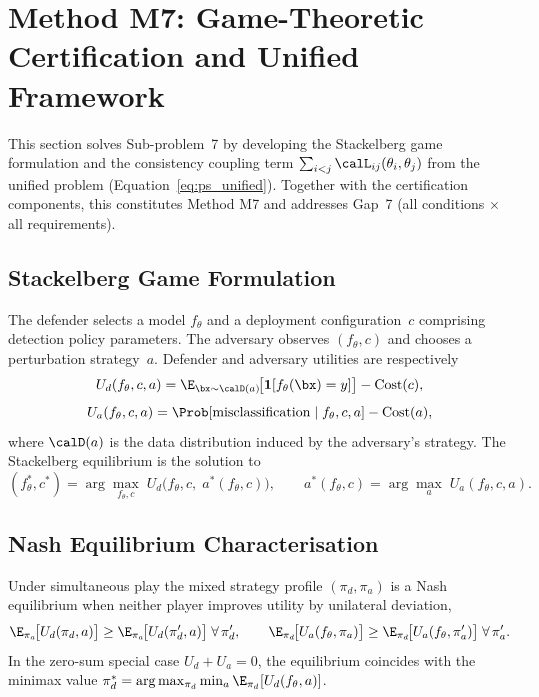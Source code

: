 \section{Method M7: Game-Theoretic Certification and Unified Framework}
\label{sec:game}

This section solves Sub-problem~7 by developing the Stackelberg game formulation and the consistency coupling term $\sum_{i<j}\calL_{ij}(\theta_i,\theta_j)$ from the unified problem (Equation~\eqref{eq:ps_unified}). Together with the certification components, this constitutes Method M7 and addresses Gap~7 (all conditions $\times$ all requirements).

\subsection{Stackelberg Game Formulation}

The defender selects a model $f_\theta$ and a deployment configuration~$c$ comprising detection policy parameters. The adversary observes $(f_\theta,c)$ and chooses a perturbation strategy~$a$. Defender and adversary utilities are respectively
\begin{equation}
U_d(f_\theta,c,a)
= \E_{\bx\sim\calD(a)}\!\bigl[\mathbf{1}[f_\theta(\bx)=y]\bigr] - \mathrm{Cost}(c),
\label{eq:game_ud}
\end{equation}
\begin{equation}
U_a(f_\theta,c,a)
= \Prob[\text{misclassification}\mid f_\theta,c,a] - \mathrm{Cost}(a),
\label{eq:game_ua}
\end{equation}
where $\calD(a)$ is the data distribution induced by the adversary's strategy. The Stackelberg equilibrium is the solution to
\begin{equation}
(f_\theta^*,c^*)
= \arg\max_{f_\theta,c}\;U_d\!\bigl(f_\theta,c,\;a^*(f_\theta,c)\bigr),
\qquad
a^*(f_\theta,c)=\arg\max_a\;U_a(f_\theta,c,a).
\label{eq:game_stackel}
\end{equation}

\subsection{Nash Equilibrium Characterisation}

Under simultaneous play the mixed strategy profile $(\pi_d,\pi_a)$ is a Nash equilibrium when neither player improves utility by unilateral deviation,
\begin{equation}
\E_{\pi_a}\!\bigl[U_d(\pi_d,a)\bigr]
\ge \E_{\pi_a}\!\bigl[U_d(\pi_d',a)\bigr]\;\forall\,\pi_d',
\qquad
\E_{\pi_d}\!\bigl[U_a(f_\theta,\pi_a)\bigr]
\ge \E_{\pi_d}\!\bigl[U_a(f_\theta,\pi_a')\bigr]\;\forall\,\pi_a'.
\label{eq:game_nash}
\end{equation}
In the zero-sum special case $U_d+U_a=0$, the equilibrium coincides with the minimax value $\pi_d^*=\arg\max_{\pi_d}\min_a\E_{\pi_d}[U_d(f_\theta,a)]$.

